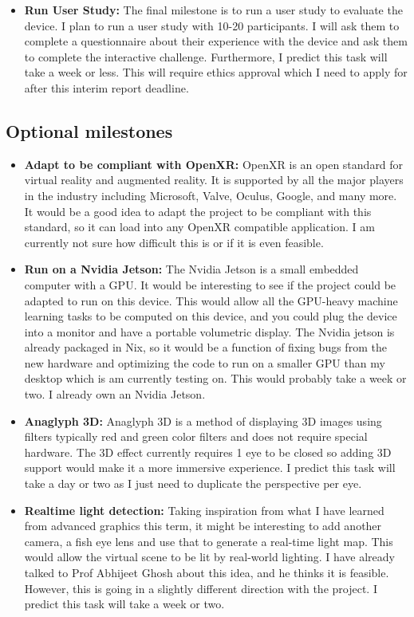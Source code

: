 \begin{itemize}
    \item \textbf{Run User Study:} The final milestone is to run a user study to evaluate the device. I plan to run a user study with 10-20 participants. I will ask them to complete a questionnaire about their experience with the device and ask them to complete the interactive challenge. Furthermore, I predict this task will take a week or less. This will require ethics approval which I need to apply for after this interim report deadline.
\end{itemize}

\subsection{Optional milestones}
\begin{itemize}
    \item \textbf{Adapt to be compliant with OpenXR:} OpenXR is an open standard for virtual reality and augmented reality. It is supported by all the major players in the industry including Microsoft, Valve, Oculus, Google, and many more. It would be a good idea to adapt the project to be compliant with this standard, so it can load into any OpenXR compatible application. I am currently not sure how difficult this is or if it is even feasible.

    \item \textbf{Run on a Nvidia Jetson:} The Nvidia Jetson is a small embedded computer with a GPU. It would be interesting to see if the project could be adapted to run on this device. This would allow all the GPU-heavy machine learning tasks to be computed on this device, and you could plug the device into a monitor and have a portable volumetric display. The Nvidia jetson is already packaged in Nix, so it would be a function of fixing bugs from the new hardware and optimizing the code to run on a smaller GPU than my desktop which is am currently testing on. This would probably take a week or two. I already own an Nvidia Jetson.

    \item \textbf{Anaglyph 3D:} Anaglyph 3D is a method of displaying 3D images using filters typically red and green color filters and does not require special hardware. The 3D effect currently requires 1 eye to be closed so adding 3D support would make it a more immersive experience. I predict this task will take a day or two as I just need to duplicate the perspective per eye.

    \item \textbf{Realtime light detection:} Taking inspiration from what I have learned from advanced graphics this term, it might be interesting to add another camera, a fish eye lens and use that to generate a real-time light map. This would allow the virtual scene to be lit by real-world lighting. I have already talked to Prof Abhijeet Ghosh about this idea, and he thinks it is feasible. However, this is going in a slightly different direction with the project. I predict this task will take a week or two.


\end{itemize}
